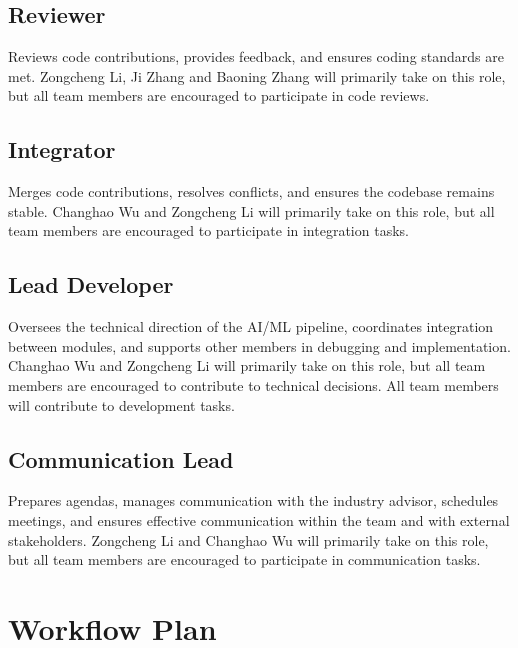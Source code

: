 \documentclass{article}
\begin{document}
\subsection*{Reviewer}
Reviews code contributions, provides feedback, and ensures coding standards are met.
Zongcheng Li, Ji Zhang and Baoning Zhang will primarily take on this role, but all team members are encouraged to participate in code reviews.

\subsection*{Integrator}
Merges code contributions, resolves conflicts, and ensures the codebase remains stable.
Changhao Wu and Zongcheng Li will primarily take on this role, but all team members are encouraged to participate in integration tasks.

\subsection*{Lead Developer}
Oversees the technical direction of the AI/ML pipeline, coordinates integration 
between modules, and supports other members in debugging and implementation.
Changhao Wu and Zongcheng Li will primarily take on this role, but all team members are encouraged to contribute to technical decisions.
All team members will contribute to development tasks.

\subsection*{Communication Lead}
Prepares agendas, manages communication with the industry advisor, schedules meetings, and ensures effective communication within the team and with external stakeholders.
Zongcheng Li and Changhao Wu will primarily take on this role, but all team members are encouraged to participate in communication tasks.

\section{Workflow Plan}
\end{document}
